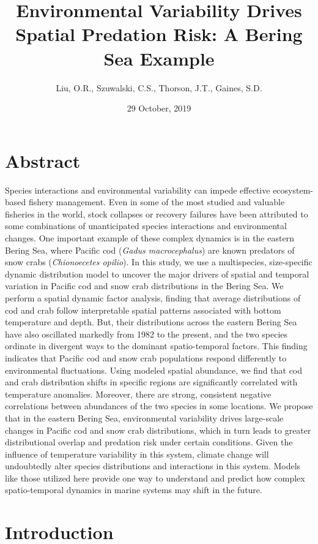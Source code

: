 \documentclass[11pt,]{article}
\title{Environmental Variability Drives Spatial Predation Risk: A Bering Sea Example}
\author{Liu, O.R., Szuwalski, C.S., Thorson, J.T., Gaines, S.D.}
\date{29 October, 2019}
\begin{document}
\maketitle

{
\setcounter{tocdepth}{2}
\tableofcontents
}
\hypertarget{abstract}{%
\section{Abstract}\label{abstract}}

Species interactions and environmental variability can impede effective ecosystem-based fishery management. Even in some of the most studied and valuable fisheries in the world, stock collapses or recovery failures have been attributed to some combinations of unanticipated species interactions and environmental changes. One important example of these complex dynamics is in the eastern Bering Sea, where Pacific cod (\emph{Gadus macrocephalus}) are known predators of snow crabs (\emph{Chionoecetes opilio}). In this study, we use a multispecies, size-specific dynamic distribution model to uncover the major drivers of spatial and temporal variation in Pacific cod and snow crab distributions in the Bering Sea. We perform a spatial dynamic factor analysis, finding that average distributions of cod and crab follow interpretable spatial patterns associated with bottom temperature and depth. But, their distributions across the eastern Bering Sea have also oscillated markedly from 1982 to the present, and the two species ordinate in divergent ways to the dominant spatio-temporal factors. This finding indicates that Pacific cod and snow crab populations respond differently to environmental fluctuations. Using modeled spatial abundance, we find that cod and crab distribution shifts in specific regions are significantly correlated with temperature anomalies. Moreover, there are strong, consistent negative correlations between abundances of the two species in some locations. We propose that in the eastern Bering Sea, environmental variability drives large-scale changes in Pacific cod and snow crab distributions, which in turn leads to greater distributional overlap and predation risk under certain conditions. Given the influence of temperature variability in this system, climate change will undoubtedly alter species distributions and interactions in this system. Models like those utilized here provide one way to understand and predict how complex spatio-temporal dynamics in marine systems may shift in the future.

\hypertarget{introduction}{%
\section{Introduction}\label{introduction}}
\end{document}
